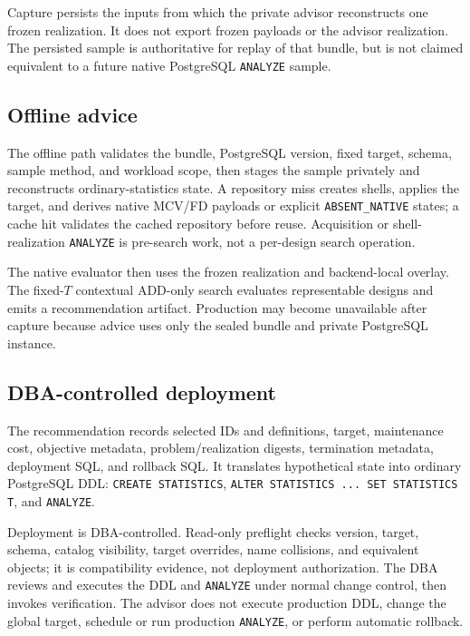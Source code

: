 Capture persists the inputs from which the private advisor reconstructs one
frozen realization.  It does not export frozen payloads or the advisor
realization.  The persisted sample is authoritative for replay of that bundle,
but is not claimed equivalent to a future native PostgreSQL \texttt{ANALYZE}
sample.

\subsection{Offline advice}

The offline path validates the bundle, PostgreSQL version, fixed target,
schema, sample method, and workload scope, then stages the sample privately
and reconstructs ordinary-statistics state.  A repository miss creates shells,
applies the target, and derives native MCV/FD payloads or explicit
\texttt{ABSENT\_NATIVE} states; a cache hit validates the cached repository
before reuse.  Acquisition or shell-realization \texttt{ANALYZE} is
pre-search work, not a per-design search operation.

The native evaluator then uses the frozen realization and backend-local
overlay.  The fixed-$T$ contextual ADD-only search evaluates representable
designs and emits a recommendation artifact.  Production may become
unavailable after capture because advice uses only the sealed bundle and
private PostgreSQL instance.

\subsection{DBA-controlled deployment}

The recommendation records selected IDs and definitions, target, maintenance
cost, objective metadata, problem/realization digests, termination metadata,
deployment SQL, and rollback SQL.  It translates hypothetical state into
ordinary PostgreSQL DDL: \texttt{CREATE STATISTICS},
\texttt{ALTER STATISTICS ... SET STATISTICS T}, and \texttt{ANALYZE}.

Deployment is DBA-controlled.  Read-only preflight checks version, target,
schema, catalog visibility, target overrides, name collisions, and equivalent
objects; it is compatibility evidence, not deployment authorization.  The DBA
reviews and executes the DDL and \texttt{ANALYZE} under normal change control,
then invokes verification.  The advisor does not execute production DDL,
change the global target, schedule or run production \texttt{ANALYZE}, or
perform automatic rollback.

